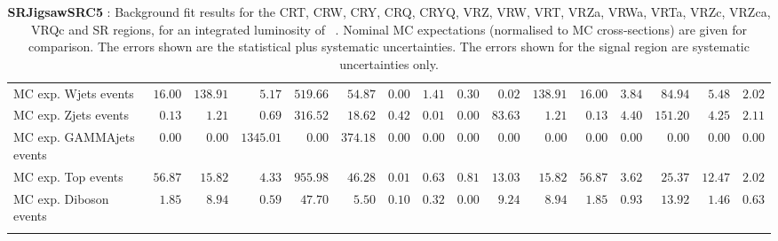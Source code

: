\begin{table}
{\begin{tabular*}{\textwidth}{@{\extracolsep{\fill}}lrrrrrrrrrrrrrrr}
        MC exp. Wjets events         & $16.00$          & $138.91$          & $5.17$          & $519.66$          & $54.87$          & $0.00$          & $1.41$          & $0.30$          & $0.02$          & $138.91$          & $16.00$          & $3.84$          & $84.94$          & $5.48$          & $2.02$              \\
        MC exp. Zjets events         & $0.13$          & $1.21$          & $0.69$          & $316.52$          & $18.62$          & $0.42$          & $0.01$          & $0.00$          & $83.63$          & $1.21$          & $0.13$          & $4.40$          & $151.20$          & $4.25$          & $2.11$              \\
        MC exp. GAMMAjets events         & $0.00$          & $0.00$          & $1345.01$          & $0.00$          & $374.18$          & $0.00$          & $0.00$          & $0.00$          & $0.00$          & $0.00$          & $0.00$          & $0.00$          & $0.00$          & $0.00$          & $0.00$              \\
        MC exp. Top events         & $56.87$          & $15.82$          & $4.33$          & $955.98$          & $46.28$          & $0.01$          & $0.63$          & $0.81$          & $13.03$          & $15.82$          & $56.87$          & $3.62$          & $25.37$          & $12.47$          & $2.02$              \\
        MC exp. Diboson events         & $1.85$          & $8.94$          & $0.59$          & $47.70$          & $5.50$          & $0.10$          & $0.32$          & $0.00$          & $9.24$          & $8.94$          & $1.85$          & $0.93$          & $13.92$          & $1.46$          & $0.63$              \\
\noalign{\smallskip}\hline\noalign{\smallskip}
\end{tabular*}
}
\caption{{\bf SRJigsawSRC5} : Background fit results for the CRT, CRW, CRY, CRQ, CRYQ, VRZ, VRW, VRT, VRZa, VRWa, VRTa, VRZc, VRZca, VRQc and SR regions, for an integrated luminosity of \ourintlumi~\ifb. Nominal MC expectations (normalised to MC cross-sections) are given for comparison. The errors shown are the statistical plus systematic uncertainties. The errors shown for the signal region are systematic uncertainties only.}
\label{table.results.systematics.in.logL.fit.CRT.CRW.CRY.CRQ.CRYQ.VRZ.VRW.VRT.VRZa.VRWa.VRTa.VRZc.VRZca.VRQc.SR.SRJigsawSRC5}
\end{table}
%